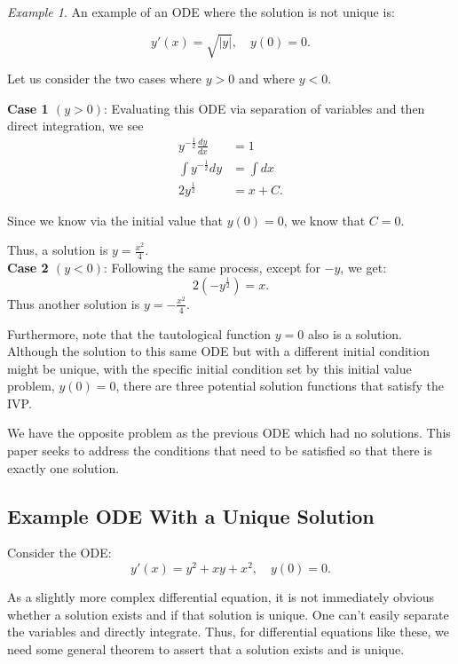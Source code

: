 \documentclass{article}
\theoremstyle{remark}
\newtheorem{example}{Example}
\begin{document}
\begin{example} An example of an ODE where the solution is not unique is:

$$y'(x) = \sqrt{|y|}, \quad y(0) = 0.$$


Let us consider the two cases where $y>0$ and where $y<0$.

\textbf{Case 1 $(y>0)$}:
Evaluating this ODE via separation of variables and then direct integration, we see
\begin{align*}
y^{-\frac{1}{2}}\frac{dy}{dx} &= 1 \\
\int y^{-\frac{1}{2}}dy &= \int dx \\
2y^{\frac{1}{2}} &= x +C.
\end{align*}

Since we know via the initial value that $y(0) = 0$, we know that $C = 0$.

Thus, a solution is $y = \frac{x^2}{4}$.\\


\textbf{Case 2 $(y<0)$}:
Following the same process, except for $-y$, we get:
$$ 2(-y^{\frac{1}{2}}) = x.$$
Thus another solution is $y = -\frac{x^2}{4}$.




Furthermore, note that the tautological function $y = 0$ also is a solution. Although the solution to this same ODE but with a different initial condition might be unique, with the specific initial condition set by this initial value problem, $y(0) = 0$, there are three potential solution functions that satisfy the IVP.


We have the opposite problem as the previous ODE which had no solutions. This paper seeks to address the conditions that need to be satisfied so that there is exactly one solution.

\end{example}

\subsection{Example ODE With a Unique Solution}
Consider the ODE:
$$y'(x)= y^2 + xy + x^2, \quad y(0) = 0.$$

As a slightly more complex differential equation, it is not immediately obvious whether a solution exists and if that solution is unique. One can't easily separate the variables and directly integrate. Thus, for differential equations like these, we need some general theorem to assert that a solution exists and is unique.\\
\end{document}
